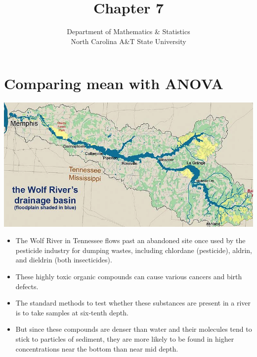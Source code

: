 \documentclass[
  ignorenonframetext,
]{beamer}
\title{Chapter 7}
\subtitle{Inference for numerical data\footnote<.->{These notes use
  content from OpenIntro Statistics Slides by Mine Cetinkaya-Rundel.}}
\author{Department of Mathematics \& Statistics\\
North Carolina A\&T State University}
\date{}
\providecommand{\tightlist}{%
  \setlength{\itemsep}{0pt}\setlength{\parskip}{0pt}}
\begin{document}
\frame{\titlepage}

\hypertarget{comparing-mean-with-anova}{%
\section{Comparing mean with ANOVA}\label{comparing-mean-with-anova}}

\begin{frame}{}
\protect\hypertarget{section}{}
\centering

\includegraphics[width=\textwidth,height=0.25\textheight]{wolf.png}

\begin{itemize}
\tightlist
\item
  The Wolf River in Tennessee flows past an abandoned site once used by
  the pesticide industry for dumping wastes, including chlordane
  (pesticide), aldrin, and dieldrin (both insecticides).
\end{itemize}

\pause

\begin{itemize}
\tightlist
\item
  These highly toxic organic compounds can cause various cancers and
  birth defects.
\end{itemize}

\pause

\begin{itemize}
\tightlist
\item
  The standard methods to test whether these substances are present in a
  river is to take samples at six-tenth depth.
\end{itemize}

\pause

\begin{itemize}
\tightlist
\item
  But since these compounds are denser than water and their molecules
  tend to stick to particles of sediment, they are more likely to be
  found in higher concentrations near the bottom than near mid depth.
\end{itemize}
\end{frame}
\end{document}
